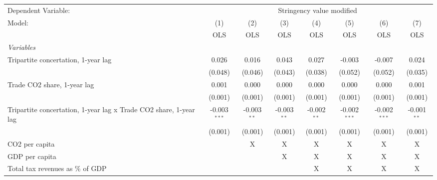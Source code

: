 
\begingroup
\centering
\begin{tabular}{lccccccc}
   \toprule
   Dependent Variable: & \multicolumn{7}{c}{Stringency value modified}\\
   Model:                                                            & (1)            & (2)           & (3)           & (4)           & (5)            & (6)            & (7)\\  
                                                                     &  OLS           & OLS           & OLS           & OLS           & OLS            & OLS            & OLS\\  
   \midrule
   \emph{Variables}\\
   Tripartite concertation, 1-year lag                               & 0.026          & 0.016         & 0.043         & 0.027         & -0.003         & -0.007         & 0.024\\   
                                                                     & (0.048)        & (0.046)       & (0.043)       & (0.038)       & (0.052)        & (0.052)        & (0.035)\\   
   Trade CO2 share, 1-year lag                                       & 0.001          & 0.000         & 0.000         & 0.000         & 0.000          & 0.000          & 0.001\\   
                                                                     & (0.001)        & (0.001)       & (0.001)       & (0.001)       & (0.001)        & (0.001)        & (0.001)\\   
   Tripartite concertation, 1-year lag x Trade CO2 share, 1-year lag & -0.003$^{***}$ & -0.003$^{**}$ & -0.003$^{**}$ & -0.002$^{**}$ & -0.002$^{***}$ & -0.002$^{***}$ & -0.001$^{**}$\\   
                                                                     & (0.001)        & (0.001)       & (0.001)       & (0.001)       & (0.001)        & (0.001)        & (0.001)\\   
   CO2 per capita                                                    &                & X             & X             & X             & X              & X              & X\\  
   GDP per capita                                                    &                &               & X             & X             & X              & X              & X\\  
   Total tax revenues as \% of GDP                                   &                &               &               & X             & X              & X              & X\\  

\end{tabular}
